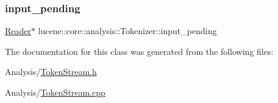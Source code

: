 \mbox{\label{classlucene_1_1core_1_1analysis_1_1Tokenizer_ac968137c9d44ef57a69c8df4e6e628ff}} 
\subsubsection{\texorpdfstring{input\+\_\+pending}{input\_pending}}
{\footnotesize\ttfamily \mbox{\hyperlink{classlucene_1_1core_1_1analysis_1_1Reader}{Reader}}$\ast$ lucene\+::core\+::analysis\+::\+Tokenizer\+::input\+\_\+pending\hspace{0.3cm}{\ttfamily [protected]}}



The documentation for this class was generated from the following files\+:\begin{DoxyCompactItemize}
\item 
Analysis/\mbox{\hyperlink{TokenStream_8h}{Token\+Stream.\+h}}\item 
Analysis/\mbox{\hyperlink{TokenStream_8cpp}{Token\+Stream.\+cpp}}\end{DoxyCompactItemize}
